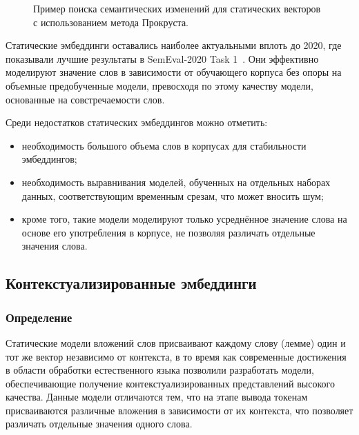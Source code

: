 \documentclass[LI,VKR]{HSEUniversity}
\begin{document}
\begin{figure}[H]
    \hfill
    \caption{Пример поиска семантических изменений для статических векторов с использованием метода Прокруста.}
    \label{fig:mainfig}
\end{figure}

Статические эмбеддинги оставались наиболее актуальными вплоть до 2020,
где показывали лучшие результаты в SemEval-2020 Task 1~\cite{semeval2020task}.
Они эффективно моделируют значение слов в зависимости от обучающего корпуса
без опоры на объемные предобученные модели,
превосходя по этому качеству модели, основанные на совстречаемости слов.

Среди недостатков статических эмбеддингов можно отметить:
\begin{itemize}
    \item необходимость большого объема слов в корпусах для стабильности эмбеддингов;
    \item необходимость выравнивания моделей, обученных на отдельных наборах данных,
соответствующим временным срезам, что может вносить шум;
    \item кроме того, такие модели моделируют только усреднённое значение слова на основе его употребления в корпусе,
не позволяя различать отдельные значения слова.
\end{itemize}

\subsection{Контекстуализированные эмбеддинги}

\subsubsection{Определение}

Статические модели вложений слов присваивают каждому слову (лемме) один и тот же вектор
независимо от контекста, в то время как современные достижения в области обработки
естественного языка позволили разработать модели,
обеспечивающие получение контекстуализированных представлений высокого качества.
Данные модели отличаются тем, что на этапе вывода токенам присваиваются различные вложения
в зависимости от их контекста, что позволяет различать отдельные значения одного слова.
\end{document}
